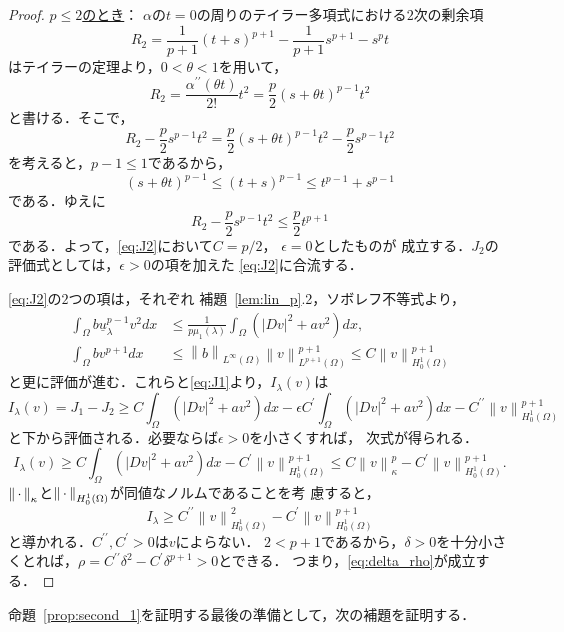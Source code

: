 \begin{proof}
 \underline{{$p \leq 2$}のとき}：
 $\alpha$の$t = 0$の周りのテイラー多項式における$2$次の剰余項
 \[
  R_2 = \frac{1}{p+1} (t+s)^{p+1} - \frac{1}{p+1} s^{p+1} -s^p t
 \]
 はテイラーの定理より，$0 < \theta < 1$を用いて，
 \[
  R_2 = \frac{\alpha^{\prime\prime}(\theta t)}{2!} t^2 = \frac{p}{2}(s
 + \theta t)^{p-1} t^2
 \]
 と書ける．そこで，
 \[
  R_2 - \frac{p}{2}s^{p-1} t^2 = \frac{p}{2}(s
 + \theta t)^{p-1} t^2 - \frac{p}{2}s^{p-1} t^2
 \]
 を考えると，$p - 1 \leq 1$であるから，
 \[
  (s + \theta t)^{p-1} \leq (t+ s)^{p-1} \leq t^{p-1} + s^{p-1}
 \]
 である．ゆえに
 \[
  R_2 - \frac{p}{2}s^{p-1} t^2 \leq \frac{p}{2} t^{p+1}
 \]
 である．よって，\eqref{eq:J2}において$C = p/2$，
 $\epsilon = 0$としたものが
 成立する．$J_2$の評価式としては，$\epsilon > 0$の項を加えた
 \eqref{eq:J2}に合流する．

 \eqref{eq:J2}の$2$つの項は，それぞれ
 補題~\ref{lem:lin_p}.2，ソボレフ不等式より，
 \begin{align*}
  \int_\Omega b\underline{u}_\lambda^{p-1} v^2 dx &\leq
  \frac{1}{p\mu_1(\lambda)} \int_\Omega \left( \lvert Dv \rvert^2 +
  av^2 \right) dx, \\
  \int_\Omega bv^{p+1} dx &\leq \left\| b \right\|_{L^\infty(\Omega)}
  \left\| v \right\|_{L^{p+1}(\Omega)}^{p+1} \leq C \left\| v
  \right\|_{H_0^1(\Omega)}^{p+1}
 \end{align*}
 と更に評価が進む．これらと\eqref{eq:J1}より，$I_\lambda(v)$は
 \[
  I_\lambda(v) = J_1 - J_2 \geq C \int_\Omega \left( \lvert Dv
 \rvert^2 + a v^2 \right) dx - \epsilon C^\prime \int_\Omega \left(
 \lvert Dv \rvert^2 + av^2 \right) dx - C^{\prime\prime} \left\| v \right\|^{p+1}_{H_0^1(\Omega)}
 \]
 と下から評価される．必要ならば$\epsilon > 0$を小さくすれば，
 次式が得られる．
 \[
  I_\lambda (v) \geq C \int_\Omega \left( \lvert Dv \rvert^2 + av^2
 \right) dx - C^\prime \left\| v \right\|_{H_0^1(\Omega)}^{p+1} \leq C
 \left\| v \right\|_{\kappa}^p - C^\prime \left\| v
 \right\|^{p+1}_{H_0^1(\Omega)}.
 \]
 $\left\|\, \cdot \, \right\|_\kappa$と$\left\|\, \cdot \, \right\|_{H_0^1(\Omega)}$が同値なノルムであることを考
 慮すると，
 \[
  I_\lambda \geq C^{\prime\prime} \left\| v \right\|_{H_0^1(\Omega)}^2
 - C^{\prime} \left\| v \right\|_{H_0^1(\Omega)}^{p+1}
 \]
 と導かれる．$C^{\prime\prime}, C^\prime > 0$は$v$によらない．
 $2 < p+1$であるから，$\delta > 0$を十分小さくとれば，$\rho =
 C^{\prime\prime} \delta^2 - C^{\prime} \delta^{p+1} > 0$とできる．
 つまり，\eqref{eq:delta_rho}が成立する． \qedhere
\end{proof}

命題~\ref{prop:second_1}を証明する最後の準備として，次の補題を証明する．

